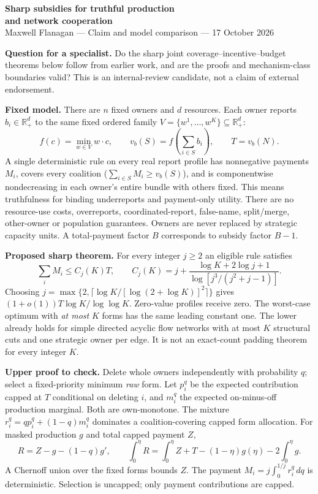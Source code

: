 \documentclass[11pt]{article}
\begin{document}
\begin{center}
{\Large\bfseries Sharp subsidies for truthful production\\and network cooperation}\\[5pt]
Maxwell Flanagan --- Claim and model comparison --- 17 October 2026
\end{center}
\textbf{Question for a specialist.} Do the sharp joint coverage--incentive--budget
theorems below follow from earlier work, and are the proofs and mechanism-class boundaries valid?
This is an internal-review candidate, not a claim of external endorsement.

\textbf{Fixed model.} There are $n$ fixed owners and $d$ resources. Each owner
reports $b_i\in\mathbb R_+^d$ to the same fixed ordered family
$V=\{w^1,\ldots,w^K\}\subseteq\mathbb R_+^d$:
\[
 f(c)=\min_{w\in V}w\cdot c,\qquad
 v_b(S)=f\left(\sum_{i\in S}b_i\right),\qquad T=v_b(N).
\]
A single deterministic rule on every real report profile has nonnegative
payments $M_i$, covers every coalition ($\sum_{i\in S}M_i\ge v_b(S)$), and
is componentwise nondecreasing in each owner's entire bundle with others fixed.
This means truthfulness for binding underreports and payment-only utility.
There are no resource-use costs, overreports, coordinated-report, false-name,
split/merge, other-owner or population guarantees. Owners are never replaced
by strategic capacity units. A total-payment factor $B$ corresponds to subsidy
factor $B-1$.

\textbf{Proposed sharp theorem.} For every integer $j\ge2$ an eligible rule satisfies
\[
 \sum_iM_i\le C_j(K)T,\qquad
 C_j(K)=j+\frac{\log K+2\log j+1}{\log[j^3/(j^2+j-1)]}.
\]
Choosing $j=\max\{2,\lceil\log K/[\log(2+\log K)]^2\rceil\}$ gives
$(1+o(1))T\log K/\log\log K$. Zero-value profiles receive zero.
The worst-case optimum with \emph{at most} $K$ forms has the same leading
constant one. The lower already holds for simple directed acyclic flow
networks with at most $K$ structural cuts and one strategic owner per edge.
It is not an exact-count padding theorem for every integer $K$.

\textbf{Upper proof to check.} Delete whole owners independently with probability
$q$; select a fixed-priority minimum \emph{raw} form. Let $p_i^q$ be the
expected contribution capped at $T$ conditional on deleting $i$, and $m_i^q$
the expected on-minus-off production marginal. Both are own-monotone.
The mixture $r_i^q=qp_i^q+(1-q)m_i^q$ dominates a coalition-covering capped
form allocation. For masked production $g$ and total capped payment $Z$,
\[
 R=Z-g-(1-q)g',\qquad
 \int_0^\eta R=\int_0^\eta Z+T-(1-\eta)g(\eta)-2\int_0^\eta g.
\]
A Chernoff union over the fixed forms bounds $Z$. The payment
$M_i=j\int_0^{1/j}r_i^q\,dq$ is deterministic. Selection is uncapped;
only payment contributions are capped.
\end{document}
